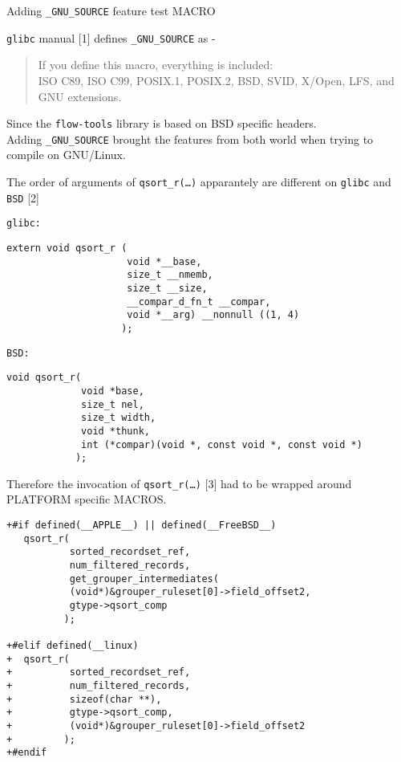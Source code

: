 Adding \lstinline!_GNU_SOURCE! feature test MACRO

\lstinline!glibc! manual {[}1{]} defines \lstinline!_GNU_SOURCE! as -

\begin{quote}
If you define this macro, everything is included:\\ISO C89, ISO C99,
POSIX.1, POSIX.2, BSD, SVID, X/Open, LFS, and GNU extensions.
\end{quote}

Since the \lstinline!flow-tools! library is based on BSD specific
headers.\\Adding \lstinline!_GNU_SOURCE! brought the features from both
world when trying to compile on GNU/Linux.

The order of arguments of \lstinline!qsort_r(…)! apparantely are
different on \lstinline!glibc! and \lstinline!BSD! {[}2{]}

\lstinline!glibc:!

\begin{lstlisting}
extern void qsort_r (
                     void *__base,
                     size_t __nmemb,
                     size_t __size,
                     __compar_d_fn_t __compar,
                     void *__arg) __nonnull ((1, 4)
                    );
\end{lstlisting}

\lstinline!BSD:!

\begin{lstlisting}
void qsort_r(
             void *base,
             size_t nel,
             size_t width,
             void *thunk,
             int (*compar)(void *, const void *, const void *)
            );
\end{lstlisting}

Therefore the invocation of \lstinline!qsort_r(…)! {[}3{]} had to be
wrapped around PLATFORM specific MACROS.

\begin{lstlisting}
+#if defined(__APPLE__) || defined(__FreeBSD__)
   qsort_r(
           sorted_recordset_ref,
           num_filtered_records,
           get_grouper_intermediates(
           (void*)&grouper_ruleset[0]->field_offset2,
           gtype->qsort_comp
          );

+#elif defined(__linux)
+  qsort_r(
+          sorted_recordset_ref,
+          num_filtered_records,
+          sizeof(char **),
+          gtype->qsort_comp,
+          (void*)&grouper_ruleset[0]->field_offset2
+         );
+#endif
\end{lstlisting}

